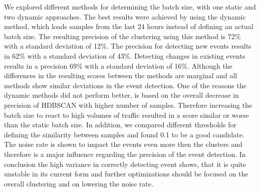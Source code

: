 We explored different methods for determining the batch size, with one static and two dynamic approaches.
The best results were achieved by using the dynamic method,
which loads samples from the last 24 hours instead of defining an actual batch size.
The resulting precision of the clustering using this method is 72\% with a standard deviation of 12\%.
The precision for detecting new events results in 62\% with a standard deviation of 43\%.
Detecting changes in existing events results in a precision 69\% with a standard deviation of 16\%.
Although the differences in the resulting scores between the methods are marginal
and all methods show similar deviations in the event detection.
One of the reasons the dynamic methods did not perform better,
is based on the overall decrease in precision of HDBSCAN with higher number of samples.
Therefore increasing the batch size to react to high volumes of traffic
resulted in a score similar or worse than the static batch size.
In addition, we compared different thresholds for defining the similarity between samples
and found 0.1 to be a good candidate.
The noise rate is shown to impact the events even more then the clusters
and therefore is a major influence regarding the precision of the event detection.
In conclusion the high variance in correctly detecting event shows,
that it is quite unstable in its current form and further optimizations should be focused
on the overall clustering and on lowering the noise rate.
